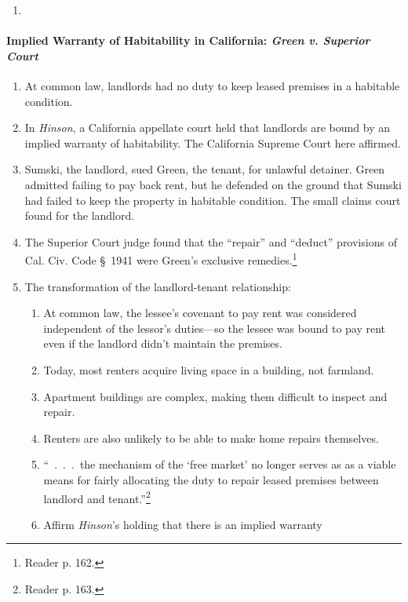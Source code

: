 \begin{enumerate}
    \item %
\end{enumerate}

\paragraph{Implied Warranty of Habitability in California: \emph{Green v. 
Superior Court}}

\begin{enumerate}
    \item At common law, landlords had no duty to keep leased premises in a 
    habitable condition.
    \item In \emph{Hinson}, a California appellate court held that landlords 
    are bound by an implied warranty of habitability. The California Supreme 
    Court here affirmed.
    \item Sumski, the landlord, sued Green, the tenant, for unlawful 
    detainer. Green admitted failing to pay back rent, but he defended on the 
    ground that Sumski had failed to keep the property in habitable condition. 
    The small claims court found for the landlord.
    \item The Superior Court judge found that the ``repair'' and ``deduct'' 
    provisions of Cal. Civ. Code \S\ 1941 were Green's exclusive 
    remedies.\footnote{Reader p. 162.}
    \item The transformation of the landlord-tenant relationship:
    \begin{enumerate}
        \item At common law, the lessee's covenant to pay rent was considered 
        independent of the lessor's duties---so the lessee was bound to pay 
        rent even if the landlord didn't maintain the premises.
        \item Today, most renters acquire living space in a building, not 
        farmland.
        \item Apartment buildings are complex, making them difficult to 
        inspect and repair.
        \item Renters are also unlikely to be able to make home repairs 
        themselves.
        \item ``~.~.~.~the mechanism of the `free market' no longer serves as 
        as a viable means for fairly allocating the duty to repair leased 
        premises between landlord and tenant.''\footnote{Reader p. 163.}
        \item Affirm \emph{Hinson}'s holding that there is an implied warranty 

\end{enumerate}
\end{enumerate}
